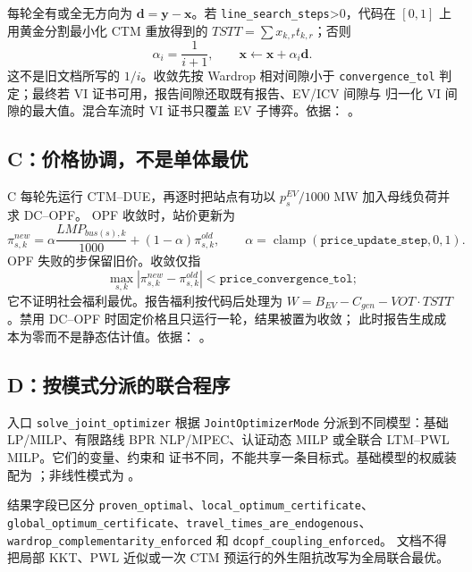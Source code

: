 每轮全有或全无方向为 $\mathbf d=\mathbf y-\mathbf x$。若
\texttt{line\_search\_steps}>0，代码在 $[0,1]$ 上用黄金分割最小化 CTM 重放得到的
$TSTT=\sum x_{k,r}t_{k,r}$；否则
\begin{equation}
 \alpha_i=\frac1{i+1},\qquad\mathbf x\leftarrow\mathbf x+\alpha_i\mathbf d.
\end{equation}
这不是旧文档所写的 $1/i$。收敛先按 Wardrop 相对间隙小于
\texttt{convergence\_tol} 判定；最终若 VI 证书可用，报告间隙还取既有报告、EV/ICV 间隙与
归一化 VI 间隙的最大值。混合车流时 VI 证书只覆盖 EV 子博弈。依据：
。

\subsection{C：价格协调，不是单体最优}
C 每轮先运行 CTM--DUE，再逐时把站点有功以 $p_s^{EV}/1000$ MW 加入母线负荷并求 DC--OPF。
OPF 收敛时，站价更新为
\begin{equation}
 \pi^{new}_{s,k}=\alpha\frac{LMP_{bus(s),k}}{1000}+(1-\alpha)\pi^{old}_{s,k},
 \qquad\alpha=\operatorname{clamp}(\texttt{price\_update\_step},0,1).
\end{equation}
OPF 失败的步保留旧价。收敛仅指
\begin{equation}
 \max_{s,k}|\pi^{new}_{s,k}-\pi^{old}_{s,k}|<
 \texttt{price\_convergence\_tol};
\end{equation}
它不证明社会福利最优。报告福利按代码后处理为
$W=B_{EV}-C_{gen}-VOT\cdot TSTT$。禁用 DC--OPF 时固定价格且只运行一轮，结果被置为收敛；
此时报告生成成本为零而不是静态估计值。依据：
。

\subsection{D：按模式分派的联合程序}
入口 \texttt{solve\_joint\_optimizer} 根据 \texttt{JointOptimizerMode} 分派到不同模型：基础
LP/MILP、有限路线 BPR NLP/MPEC、认证动态 MILP 或全联合 LTM--PWL MILP。它们的变量、约束和
证书不同，不能共享一条目标式。基础模型的权威装配为
；非线性模式为
。

结果字段已区分 \texttt{proven\_optimal}、\texttt{local\_optimum\_certificate}、
\texttt{global\_optimum\_certificate}、\texttt{travel\_times\_are\_endogenous}、
\texttt{wardrop\_complementarity\_enforced} 和 \texttt{dcopf\_coupling\_enforced}。
文档不得把局部 KKT、PWL 近似或一次 CTM 预运行的外生阻抗改写为全局联合最优。

